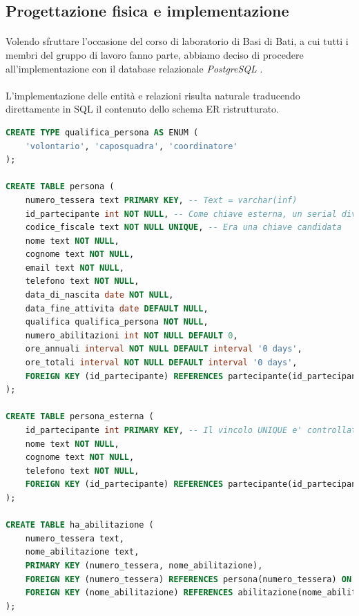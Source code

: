 \documentclass[11pt,a4paper,english]{article}
\begin{document}
\subsection{Progettazione fisica e implementazione}

\paragraph{} Volendo sfruttare l'occasione del corso di laboratorio di Basi di Bati, a cui tutti i membri del gruppo di lavoro fanno parte, abbiamo deciso di procedere all'implementazione con il database relazionale \emph{PostgreSQL} \cite{postgre}. 

\paragraph{} L'implementazione delle entità e relazioni risulta naturale traducendo direttamente in SQL il contenuto dello schema ER ristrutturato. 

\begin{lstlisting}[language=SQL, caption=Esempio di implementazione di entità e relazioni]
CREATE TYPE qualifica_persona AS ENUM (
    'volontario', 'caposquadra', 'coordinatore'
);

CREATE TABLE persona (
    numero_tessera text PRIMARY KEY, -- Text = varchar(inf)
    id_partecipante int NOT NULL, -- Come chiave esterna, un serial diventa int | Il vincolo UNIQUE e' controllato dal trigger apposito
    codice_fiscale text NOT NULL UNIQUE, -- Era una chiave candidata
    nome text NOT NULL,
    cognome text NOT NULL,
    email text NOT NULL,
    telefono text NOT NULL,
    data_di_nascita date NOT NULL,
    data_fine_attivita date DEFAULT NULL,
    qualifica qualifica_persona NOT NULL,
    numero_abilitazioni int NOT NULL DEFAULT 0,
    ore_annuali interval NOT NULL DEFAULT interval '0 days',
    ore_totali interval NOT NULL DEFAULT interval '0 days',
    FOREIGN KEY (id_partecipante) REFERENCES partecipante(id_partecipante) ON DELETE NO ACTION ON UPDATE CASCADE
);

CREATE TABLE persona_esterna (
    id_partecipante int PRIMARY KEY, -- Il vincolo UNIQUE e' controllato dal trigger apposito
    nome text NOT NULL,
    cognome text NOT NULL,
    telefono text NOT NULL,
    FOREIGN KEY (id_partecipante) REFERENCES partecipante(id_partecipante) ON DELETE NO ACTION ON UPDATE CASCADE
);

CREATE TABLE ha_abilitazione (
    numero_tessera text,
    nome_abilitazione text,
    PRIMARY KEY (numero_tessera, nome_abilitazione),
    FOREIGN KEY (numero_tessera) REFERENCES persona(numero_tessera) ON DELETE CASCADE ON UPDATE CASCADE,
    FOREIGN KEY (nome_abilitazione) REFERENCES abilitazione(nome_abilitazione) ON DELETE CASCADE ON UPDATE CASCADE
);
\end{lstlisting}
\end{document}
